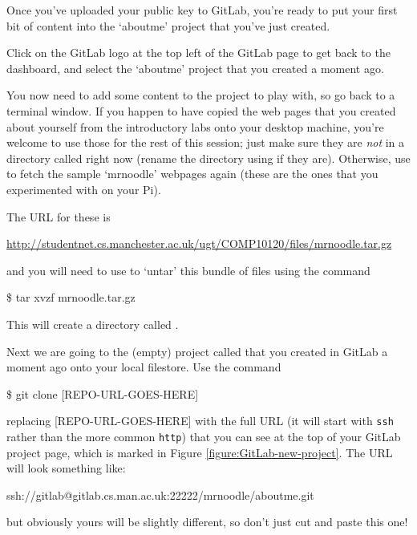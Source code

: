 Once you've uploaded your public key to GitLab, you're ready to put your first bit of content into the `aboutme' project that you've just created. 

Click on the GitLab logo at the top left of the GitLab page to get back to the dashboard, and select the `aboutme' project that you created a moment ago. 

You now need to add some content to the project to play with, so go back to a terminal window. If you happen to have copied the web pages that you created about yourself from the introductory labs onto your desktop machine, you're welcome to use those for the rest of this session; just make sure they are \emph{not} in a directory called  right now (rename the directory using  if they are). Otherwise, use  to fetch the sample `mrnoodle' webpages again (these are the ones that you experimented with on your Pi).

The URL for these is 

\url{http://studentnet.cs.manchester.ac.uk/ugt/COMP10120/files/mrnoodle.tar.gz}

and you will need to use  to `untar' this bundle of files using the command

\begin{ttoutenv}
\$ tar xvzf mrnoodle.tar.gz
\end{ttoutenv}

This will create a directory called . 

Next we are going to  the (empty) project called  that you created in GitLab a moment ago onto your local filestore. Use the  command

\begin{ttoutenv}
\$ git clone [REPO-URL-GOES-HERE]
\end{ttoutenv}

replacing [REPO-URL-GOES-HERE] with the full URL (it will start with \texttt{ssh} rather than the more common \texttt{http}) that you can see at the top of your GitLab  project page, which is marked \protect{} in Figure \ref{figure:GitLab-new-project}. The URL will look something like:

\begin{ttoutenv}
ssh://gitlab@gitlab.cs.man.ac.uk:22222/mrnoodle/aboutme.git
\end{ttoutenv}

but obviously yours will be slightly different, so don't just cut and paste this one!

